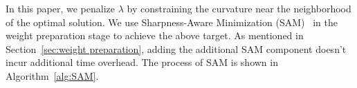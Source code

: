 In this paper, we penalize $\lambda$ by constraining the curvature near the neighborhood of the optimal solution. We use Sharpness-Aware Minimization (SAM)~\cite{SAM} in the weight preparation stage to achieve the above target. As mentioned in Section~\ref{sec:weight preparation}, adding the additional SAM component doesn't incur additional time overhead. The process of SAM is shown in Algorithm~\ref{alg:SAM}.


